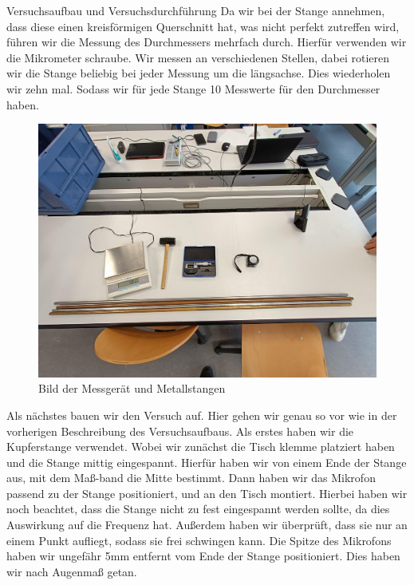\documentclass[twoside]{protokoll}
\begin{document}
\begin{aufgabe}{Versuchsaufbau und Versuchsdurchführung}
Da wir bei der Stange annehmen, dass diese einen kreisförmigen Querschnitt hat, was nicht perfekt zutreffen wird, führen wir die Messung des Durchmessers mehrfach durch. Hierfür verwenden wir die Mikrometer schraube. Wir messen an verschiedenen Stellen, dabei rotieren wir die Stange beliebig bei jeder Messung um die längsachse. Dies wiederholen wir zehn mal. Sodass wir für jede Stange 10 Messwerte für den Durchmesser haben.\\ 

\begin{figure}[H]
  \centering
  \includegraphics[width=1.0\textwidth]{Bilder/434170_428396_1A3_Materialien.pdf}
  \caption{Bild der Messgerät und Metallstangen}
  \centering
\end{figure}

Als nächstes bauen wir den Versuch auf. Hier gehen wir genau so vor wie in der vorherigen Beschreibung des Versuchsaufbaus. Als erstes haben wir die Kupferstange verwendet.
Wobei wir zunächst die Tisch klemme platziert haben und die Stange mittig eingespannt. Hierfür haben wir von einem Ende der Stange aus, mit dem Maß-band die Mitte bestimmt. Dann haben wir das Mikrofon passend zu der Stange positioniert, und an den Tisch montiert. Hierbei haben wir noch beachtet, dass die Stange nicht zu fest eingespannt werden sollte, da dies Auswirkung auf die Frequenz hat. Außerdem haben wir überprüft, dass sie nur an einem Punkt aufliegt, sodass sie frei schwingen kann. Die Spitze des Mikrofons haben wir ungefähr 5mm entfernt vom Ende der Stange positioniert. Dies haben wir nach Augenmaß getan. 


\end{aufgabe}
\end{document}
